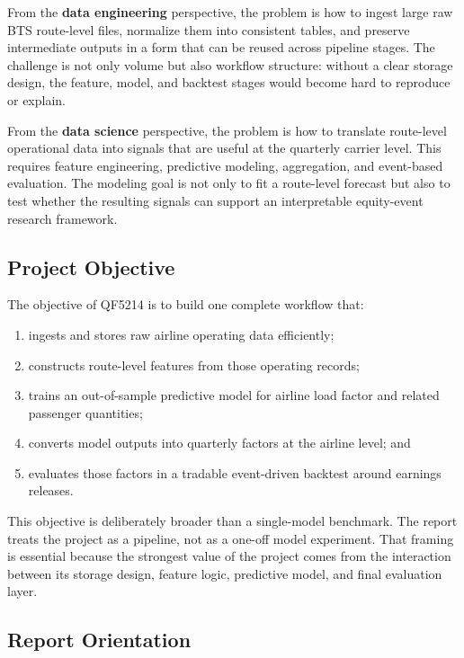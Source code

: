 \documentclass[11pt,a4paper]{article}
\begin{document}
From the \textbf{data engineering} perspective, the problem is how to ingest
large raw BTS route-level files, normalize them into consistent tables, and
preserve intermediate outputs in a form that can be reused across pipeline
stages. The challenge is not only volume but also workflow structure: without a
clear storage design, the feature, model, and backtest stages would become hard
to reproduce or explain.

From the \textbf{data science} perspective, the problem is how to translate
route-level operational data into signals that are useful at the quarterly
carrier level. This requires feature engineering, predictive modeling,
aggregation, and event-based evaluation. The modeling goal is not only to fit a
route-level forecast but also to test whether the resulting signals can support
an interpretable equity-event research framework.

\subsection{Project Objective}

The objective of QF5214 is to build one complete workflow that:

\begin{enumerate}[leftmargin=*, label=(\roman*)]
  \item ingests and stores raw airline operating data efficiently;
  \item constructs route-level features from those operating records;
  \item trains an out-of-sample predictive model for airline load factor and
  related passenger quantities;
  \item converts model outputs into quarterly factors at the airline level; and
  \item evaluates those factors in a tradable event-driven backtest around
  earnings releases.
\end{enumerate}

This objective is deliberately broader than a single-model benchmark. The
report treats the project as a pipeline, not as a one-off model experiment.
That framing is essential because the strongest value of the project comes from
the interaction between its storage design, feature logic, predictive model,
and final evaluation layer.

\subsection{Report Orientation}
\end{document}
